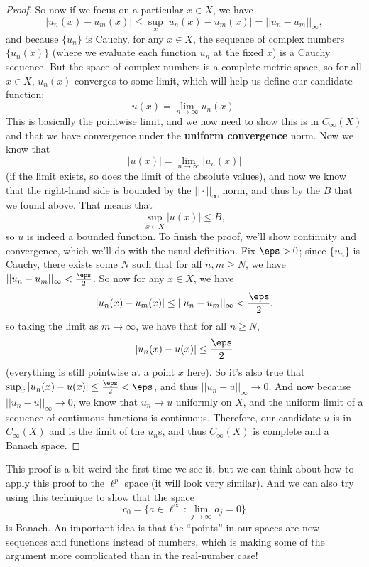 \begin{proof}
So now if we focus on a particular $x \in X$, we have
\[
    |u_n(x) - u_m(x)| \le \sup_{x} |u_n(x) - u_m(x)| = ||u_n - u_m||_{\infty},
\]
and because $\{u_n\}$ is Cauchy, for any $x \in X$, the sequence of complex numbers $\{u_n(x)\}$ (where we evaluate each function $u_n$ at the fixed $x$) is a Cauchy sequence. But the space of complex numbers is a complete metric space, so for all $x \in X$, $u_n(x)$ converges to some limit, which will help us define our candidate function:
\[
    u(x) = \lim_{n \to \infty} u_n(x).
\]
This is basically the pointwise limit, and we now need to show this is in $C_{\infty}(X)$ and that we have convergence under the \textbf{uniform convergence} norm. Now we know that 
\[
    |u(x)| = \lim_{n \to \infty} |u_n(x)|
\]
(if the limit exists, so does the limit of the absolute values), and now we know that the right-hand side is bounded by the $||\cdot||_{\infty}$ norm, and thus by the $B$ that we found above. That means that
\[
    \sup_{x \in X} |u(x)| \le B,
\]
so $u$ is indeed a bounded function. To finish the proof, we'll show continuity and convergence, which we'll do with the usual definition. Fix $\eps > 0$; since $\{u_n\}$ is Cauchy, there exists some $N$ such that for all $n, m \ge N$, we have $||u_n - u_m||_{\infty} < \frac{\eps}{2}$. So now for any $x \in X$, we have
\[
    |u_n(x) - u_m(x)| \le ||u_n - u_m||_{\infty} < \frac{\eps}{2},
\]
so taking the limit as $m \to \infty$, we have that for all $n \ge N$, 
\[
    |u_n(x) - u(x)| \le \frac{\eps}{2}
\]
(everything is still pointwise at a point $x$ here). So it's also true that $\sup_x |u_n(x) - u(x)| \le \frac{\eps}{2} < \eps$, and thus $||u_n - u||_{\infty} \to 0$. And now because $||u_n - u||_{\infty} \to 0$, we know that $u_n \to u$ uniformly on $X$, and the uniform limit of a sequence of continuous functions is continuous. Therefore, our candidate $u$ is in $C_{\infty}(X)$ and is the limit of the $u_n$s, and thus $C_{\infty}(X)$ is complete and a Banach space.
\end{proof}

This proof is a bit weird the first time we see it, but we can think about how to apply this proof to the $\ell^p$ space (it will look very similar). And we can also try using this technique to show that the space
\[
    c_0 = \{a \in \ell^{\infty}: \lim_{j \to \infty} a_j = 0\}
\]
is Banach. An important idea is that the ``points'' in our spaces are now sequences and functions instead of numbers, which is making some of the argument more complicated than in the real-number case!

